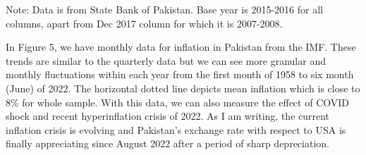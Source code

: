 \documentclass[12pt]{article}
\newcommand{\1}{\mathbbm 1}
\begin{document}
		\begin{table}[H]%
			\def\arraystretch{1}
			\begin{center}
				{\sc \caption{Annual National Inflation (December 2017 to December 2021)}}
				\begin{adjustbox}{width=0.8\textwidth}
					\setlength{\tabcolsep}{1pt}
				\end{adjustbox}
			\end{center}
			{\footnotesize{Note: Data is from State Bank of Pakistan. Base year is 2015-2016 for all columns, apart from Dec 2017 column for which it is 2007-2008.}} %
		\end{table}
		
		
			In Figure 5, we have monthly data for inflation in Pakistan from the IMF. These trends are similar to the quarterly data but we can see more granular and monthly fluctuations within each year from the first month of 1958 to six month (June) of 2022. The horizontal dotted line depicts mean inflation which is close to 8\% for whole sample. With this data, we can also measure the effect of COVID shock and recent hyperinflation crisis of 2022. As I am writing, the current inflation crisis is evolving and Pakistan's exchange rate with respect to USA is finally appreciating since August 2022 after a period of sharp depreciation.
		
\end{document}
